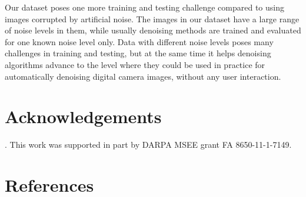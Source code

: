 \documentclass[review]{elsarticle}
\begin{document}
Our dataset poses one more training and testing challenge compared to using images corrupted by artificial noise. The images in our dataset have a large range of noise levels in them, while usually denoising methods are trained and evaluated for one known noise level only. Data with different noise levels poses many challenges in training and testing, but at the same time it helps denoising algorithms advance to the level where they could be used in practice for automatically denoising digital camera images, without any user interaction.


\section*{Acknowledgements}.
This work was supported in part by DARPA MSEE grant FA 8650-11-1-7149.


\section*{References}

 

\end{document}
